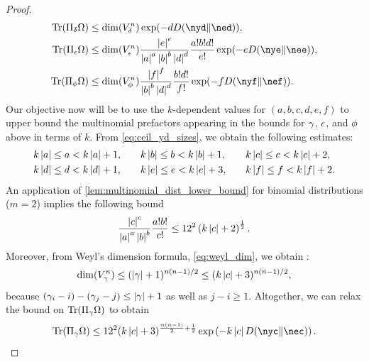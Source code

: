 \documentclass[notitlepage, 10pt]{article}
\begin{document}
\begin{proof}
\begin{align}
\begin{split}
            \Tr(\Pi_{\yd} \Omega)
            &\leq \dim(V_{\yd}^{n}) \exp(- d \kl{\nyd}{\ned}), \\
            \Tr(\Pi_{\ye} \Omega)
            &\leq \dim(V_{\ye}^{n})\frac{\abs{\ee}^{e}}{\abs{\ea}^{a}\abs{\eb}^{b}\abs{\ed}^{d}}\frac{a!b!d!}{e!} \exp(- e \kl{\nye}{\nee}), \\
            \Tr(\Pi_{\yf} \Omega)
            &\leq \dim(V_{\yf}^{n}) \frac{\abs{\ef}^{f}}{\abs{\eb}^{b}\abs{\ed}^{d}}\frac{b!d!}{f!} \exp(- f \kl{\nyf}{\nef}).
        \end{split}
    \end{align}
    Our objective now will be to use the $k$-dependent values for $(a,b,c,d,e,f)$ to upper bound the multinomial prefactors appearing in the bounds for $\gamma$, $\epsilon$, and $\phi$ above in terms of $k$.
    From \cref{eq:ceil_yd_sizes}, we obtain the following estimates:
    \begin{equation}
        \label{eq:size_estimates}
        \begin{alignedat}{3}
            &k \left|a\right| \leq a < k \left|a\right| + 1, \qquad 
            &&k \left|b\right| \leq b < k \left|b\right| + 1, \qquad 
            &&k \left|c\right| \leq c < k \left|c\right| + 2, \\
            &k \left|d\right| \leq d < k \left|d\right| + 1, \qquad 
            &&k \left|e\right| \leq e < k \left|e\right| + 3, \qquad 
            &&k \left|f\right| \leq f < k \left|f\right| + 2.
        \end{alignedat}
    \end{equation}
    An application of \cref{lem:multinomial_dist_lower_bound} for binomial distributions ($m=2$) implies the following bound
    \begin{equation}
        \frac{\left|c\right|^{c}}{\left|a\right|^{a}\left|b\right|^{b}}\frac{a!b!}{c!}
        \leq 12^{2}\left(k \left|c\right|+2\right)^\frac{1}{2}.
    \end{equation}
    Moreover, from Weyl's dimension formula, \cref{eq:weyl_dim}, we obtain \cite[Equation 7]{christandl2006spectra}:
    \begin{equation}
        \dim(V_{\gamma}^{n}) \leq (\left|\gamma\right|+1)^{n(n-1)/2} \leq (k\left|c\right|+3)^{n(n-1)/2},
    \end{equation}
    because $(\gamma_i - i)-(\gamma_j - j) \leq \left|\gamma\right| + 1$ as well as $j-i\geq 1$.
    Altogether, we can relax the bound on $\operatorname{Tr}(\Pi_{\gamma} \Omega)$ to obtain
    \begin{equation}
        \Tr(\Pi_{\yc} \Omega) \leq
        12^{2}(k\abs{\ec}+3)^{\frac{n(n-1)}{2}+\frac{1}{2}}\exp\left(-k\abs{\ec}\kl{\nyc}{\nec}\right).

\end{equation}
\end{proof}
\end{document}
